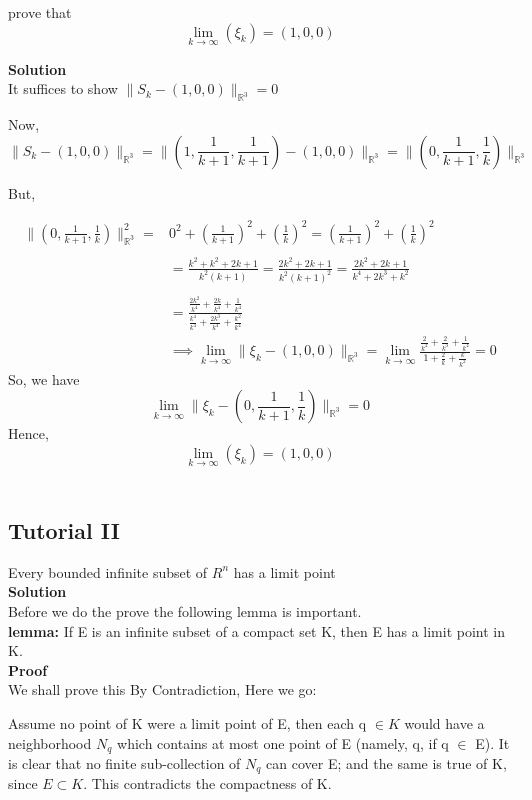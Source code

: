 \documentclass{article}
\begin{document}
prove that $$\lim_{k \rightarrow \infty}(\xi_k)= (1,0,0) $$

\textbf{Solution}\\
It suffices to show  $\|S_k-(1,0,0)\|_{\mathbb{R}^3}=0$

Now, $$\|S_k-(1,0,0)\|_{\mathbb{R}^3}= \|(1,\frac{1}{k+1},\frac{1}{k+1})-(1,0,0)\|_{\mathbb{R}^3} =\|(0,\frac{1}{k+1},\frac{1}{k})\|_{\mathbb{R}^3}$$

But, 

$$\begin{align}
    \|(0,\frac{1}{k+1},\frac{1}{k})\|_{\mathbb{R}^3}^2=&0^2+(\frac{1}{k+1})^2+(\frac{1}{k})^2 = (\frac{1}{k+1})^2+(\frac{1}{k})^2\\\\&=\frac{k^2+k^2+2k+1}{k^2(k+1)} =\frac{2k^2+2k+1}{k^2(k+1)^2} = \frac{2k^2+2k+1}{k^4+2k^3+k^2} \\\\&=\frac{\frac{2k^2}{k^4}+\frac{2k}{k^4}+\frac{1}{k^4}}{\frac{k^4}{k^4}+\frac{2k^3}{k^4}+\frac{k^2}{k^4}}\\
    & \implies \lim_{k\rightarrow \infty} \|\xi_k -(1,0,0)\|_{\mathbb{R}^3} = \lim_{k\rightarrow \infty}\frac{\frac{2}{k^2}+\frac{2}{k^3}+\frac{1}{k^4}}{1+\frac{2}{k}+\frac{k}{k^2}} = 0
\end{align}
    $$
So, we have  $$\lim_{k\rightarrow \infty} \| \xi_k -(0,\frac{1}{k+1},\frac{1}{k})\|_{\mathbb{R}^3}=0$$
Hence, $$\lim_{k \rightarrow \infty}(\xi_k)= (1,0,0) $$\\

\newpage
\subsection{Tutorial II }
Every bounded infinite subset of $R^n$ has a limit point\\

\textbf{Solution}\\

Before we do the prove the following lemma is important.\\

\textbf{lemma:} If E is an infinite subset of a compact set K, then E has a limit point in K.\\

\textbf{Proof} \\
We shall prove this By Contradiction, Here we go:

Assume no point of K were a limit point of E, then each q $\in K$ would
have a neighborhood $N_q$ which contains at most one point of E (namely,
q, if q $\in$ E). It is clear that no finite sub-collection of ${N_q}$ can cover E;
and the same is true of K, since $E \subset K$. This contradicts the compactness of K. 
\end{document}
